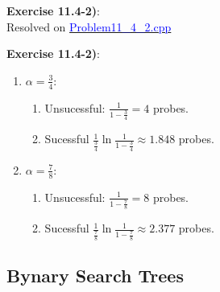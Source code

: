 \documentclass{article}
\newcounter{exercise}[section]   %
\begin{document}
\textbf{Exercise 11.4-2)}:\\
Resolved on \href{https://github.com/Graburr/Algorithms_CLRS_4ed_solutions/tree/main/chapter3/Hash_Tables/Problem11_4_2.cpp}
{\textcolor{Blue}{Problem11\_4\_2.cpp}}

\textbf{Exercise 11.4-2)}:
\begin{enumerate}
    \item \(\alpha = \frac{3}{4}\):
    \begin{enumerate}
        \item Unsucessful: \(\frac{1}{1 - \frac{3}{4}} = 4\) probes.
        \item Sucessful \(\frac{1}{\frac{3}{4}} \ln \frac{1}{1 - \frac{3}{4}} \approx 1.848\)
        probes.
    \end{enumerate}

    \item \(\alpha = \frac{7}{8}\):
    \begin{enumerate}
        \item Unsucessful: \(\frac{1}{1 - \frac{7}{8}} = 8\) probes.
        \item Sucessful \(\frac{1}{\frac{7}{8}} \ln \frac{1}{1 - \frac{7}{8}} \approx 2.377\)
        probes.
    \end{enumerate}
\end{enumerate}


\subsection{Bynary Search Trees}
\setcounter{exercise}{0}
\end{document}
